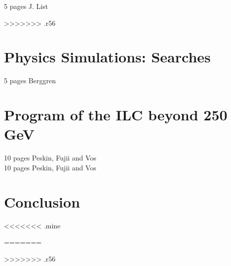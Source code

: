 \documentclass[%
 reprint,
 amsmath,amssymb,
 aps,
]{revtex4-1}
\begin{document}
  5 pages J. List
  
  

>>>>>>> .r56
\section{\label{sec:searches}Physics Simulations: Searches }


  5 pages Berggren
  
  

\section{\label{sec:ILC-HE}Program of the ILC beyond 250 GeV }
  10 pages Peskin, Fujii and Vos \\
  

  10 pages Peskin, Fujii and Vos
\section{\label{sec:conclusion}Conclusion}




%
<<<<<<< .mine

=======

>>>>>>> .r56
\end{document}
